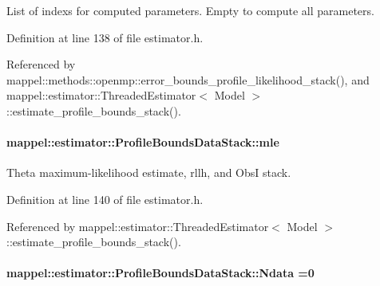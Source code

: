 List of indexs for computed parameters. Empty to compute all parameters. 



Definition at line 138 of file estimator.\+h.



Referenced by mappel\+::methods\+::openmp\+::error\+\_\+bounds\+\_\+profile\+\_\+likelihood\+\_\+stack(), and mappel\+::estimator\+::\+Threaded\+Estimator$<$ Model $>$\+::estimate\+\_\+profile\+\_\+bounds\+\_\+stack().

\paragraph[{\texorpdfstring{mle}{mle}}]{ mappel\+::estimator\+::\+Profile\+Bounds\+Data\+Stack\+::mle}\hypertarget{structmappel_1_1estimator_1_1ProfileBoundsDataStack_a2960e31d721096fd44d5ca4dd652a5a9}{}\label{structmappel_1_1estimator_1_1ProfileBoundsDataStack_a2960e31d721096fd44d5ca4dd652a5a9}


Theta maximum-\/likelihood estimate, rllh, and ObsI stack. 



Definition at line 140 of file estimator.\+h.



Referenced by mappel\+::estimator\+::\+Threaded\+Estimator$<$ Model $>$\+::estimate\+\_\+profile\+\_\+bounds\+\_\+stack().

\paragraph[{\texorpdfstring{Ndata}{Ndata}}]{ mappel\+::estimator\+::\+Profile\+Bounds\+Data\+Stack\+::\+Ndata =0}\hypertarget{structmappel_1_1estimator_1_1ProfileBoundsDataStack_ad3883bc3355fbde3dd47eb3dac23785e}{}\label{structmappel_1_1estimator_1_1ProfileBoundsDataStack_ad3883bc3355fbde3dd47eb3dac23785e}


